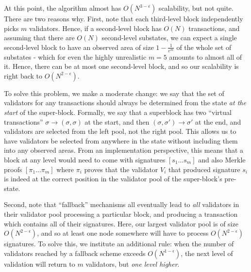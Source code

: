 \documentclass[11pt,a4paper]{report}
\theoremstyle{plain}
\theoremstyle{definition}
\theoremstyle{remark}
\begin{document}
At this point, the algorithm almost has $O(N^{3-\epsilon})$ scalability, but not quite. There are two reasons why. First, note that each third-level block independently picks $m$ validators. Hence, if a second-level block has $O(N)$ transactions, and assuming that there are $O(N)$ second-level substates, we can expect a single second-level block to have an observed area of size $1 - \frac{1}{e^m}$ of the whole set of substates - which for even the highly unrealistic $m = 5$ amounts to almost all of it. Hence, there can be at most one second-level block, and so our scalability is right back to $O(N^{2-\epsilon})$.

To solve this problem, we make a moderate change: we say that the set of validators for any transactions should always be determined from the state \emph{at the start} of the super-block. Formally, we say that a superblock has two ``virtual transactions'' $\sigma \rightarrow (\sigma, \sigma)$ at the start, and then $(\sigma, \sigma') \rightarrow \sigma'$ at the end, and validators are selected from the left pool, not the right pool. This allows us to have validators be selected from anywhere in the state without including them into any observed areas. From an implementation perspective, this means that a block at any level would need to come with signatures $[s_1 ... s_m]$ and also Merkle proofs $[\pi_1 ... \pi_m]$ where $\pi_i$ proves that the validator $V_i$ that produced signature $s_i$ is indeed at the correct position in the validator pool of the super-block's pre-state.

Second, note that ``fallback'' mechanisms all eventually lead to \emph{all} validators in their validator pool processing a particular block, and producing a transaction which contains all of their signatures. Here, our largest validator pool is of size $O(N^{2-\epsilon})$, and so at least one node somewhere will have to process $O(N^{2-\epsilon})$ signatures. To solve this, we institute an additional rule: when the number of validators reached by a fallback scheme exceeds $O(N^{1-\epsilon})$, the next level of validation will return to $m$ validators, but \emph{one level higher}.
\end{document}

